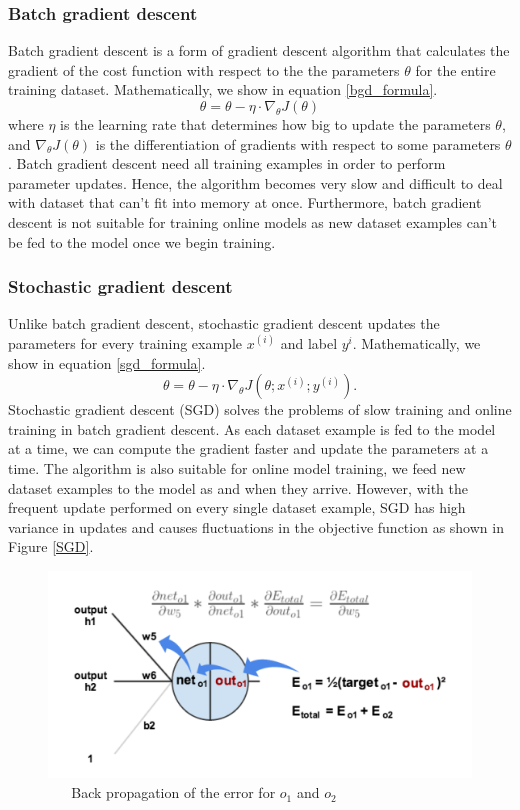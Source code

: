 \documentclass[master]{thesis-uestc}
\begin{document}
\subsubsection{Batch gradient descent}
Batch gradient descent is a form of gradient descent algorithm that calculates the gradient of the cost function with respect to the the parameters $\theta$ for the entire training dataset. Mathematically, we show in equation \ref{bgd_formula}.
\begin{equation}
    \theta = \theta - \eta \cdot \nabla_\theta J(\theta)
\label{bgd_formula}
\end{equation}
where $\eta$ is the learning rate that determines how big to update the parameters $\theta$, and $\nabla_\theta J(\theta)$ is the differentiation of gradients with respect to some parameters $\theta$. Batch gradient descent need all training examples in order to perform parameter updates. Hence, the algorithm becomes very slow and difficult to deal with dataset that can't fit into memory at once. Furthermore, batch gradient descent is not suitable for training online models as new dataset examples can't be fed to the model once we begin training. 

\subsubsection{Stochastic gradient descent}
Unlike batch gradient descent, stochastic gradient descent updates the parameters for every training example $x^{(i)}$ and label $y^{i}$. Mathematically, we show in equation \ref{sgd_formula}.
\begin{equation}
    \theta = \theta - \eta \cdot\nabla_\theta J(\theta;x^{(i)};y^{(i)}).
\label{sgd_formula}
\end{equation}
Stochastic gradient descent (SGD) solves the problems of slow training and online training in batch gradient descent. As each dataset example is fed to the model at a time, we can compute the gradient faster and update the parameters at a time. The algorithm is also suitable for online model training, we feed new dataset examples to the model as and when they arrive. However, with the frequent update performed on every single dataset example, SGD has high variance in updates and causes fluctuations in the objective function as shown in Figure \ref{SGD}.

\begin{figure}[ht]
\includegraphics[width=5in]{pic/output_1_backprop-4.png}
\caption{\,\,\,\,\,\,\,\,\,\,Back propagation of the error for $o_1$ and $o_2$}
\label{output_1_backprop}
\end{figure}
\end{document}
